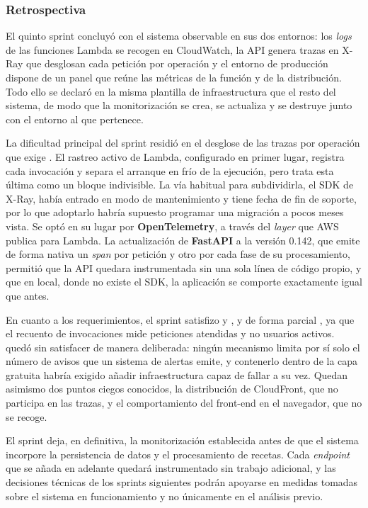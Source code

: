 \subsubsection*{Retrospectiva}

El quinto sprint concluyó con el sistema observable en sus dos entornos: los
\textit{logs} de las funciones Lambda se recogen en CloudWatch, la API genera
trazas en X-Ray que desglosan cada petición por operación y el entorno de
producción dispone de un panel que reúne las métricas de la función y de la
distribución. Todo ello se declaró en la misma plantilla de infraestructura que
el resto del sistema, de modo que la monitorización se crea, se actualiza y se
destruye junto con el entorno al que pertenece.

La dificultad principal del sprint residió en el desglose de las trazas por
operación que exige . El rastreo activo de Lambda, configurado
en primer lugar, registra cada invocación y separa el arranque en frío de la
ejecución, pero trata esta última como un bloque indivisible. La vía habitual
para subdividirla, el SDK de X-Ray, había entrado en modo de mantenimiento y
tiene fecha de fin de soporte, por lo que adoptarlo habría supuesto programar
una migración a pocos meses vista. Se optó en su lugar por
\textbf{OpenTelemetry}, a través del \textit{layer} que AWS publica para Lambda.
La actualización de \textbf{FastAPI} a la versión 0.142, que emite de forma
nativa un \textit{span} por petición y otro por cada fase de su procesamiento,
permitió que la API quedara instrumentada sin una sola línea de código propio, y
que en local, donde no existe el SDK, la aplicación se comporte exactamente
igual que antes.

En cuanto a los requerimientos, el sprint satisfizo  y
, y de forma parcial , ya que el recuento de
invocaciones mide peticiones atendidas y no usuarios activos.
 quedó sin satisfacer de manera deliberada: ningún mecanismo
limita por sí solo el número de avisos que un sistema de alertas emite, y
contenerlo dentro de la capa gratuita habría exigido añadir infraestructura
capaz de fallar a su vez. Quedan asimismo dos puntos ciegos conocidos, la
distribución de CloudFront, que no participa en las trazas, y el comportamiento
del front-end en el navegador, que no se recoge.

El sprint deja, en definitiva, la monitorización establecida antes de que el
sistema incorpore la persistencia de datos y el procesamiento de recetas. Cada
\textit{endpoint} que se añada en adelante quedará instrumentado sin trabajo
adicional, y las decisiones técnicas de los sprints siguientes podrán apoyarse
en medidas tomadas sobre el sistema en funcionamiento y no únicamente en el
análisis previo.
